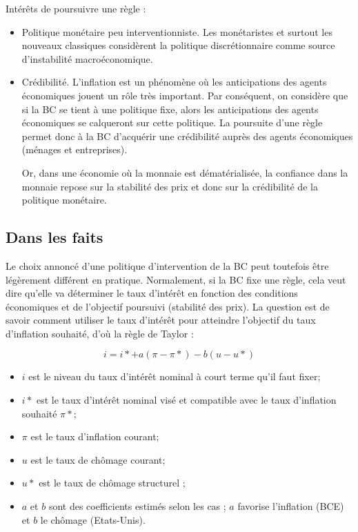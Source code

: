 Intérêts de poursuivre une règle : 

\begin{itemize}
	\item Politique monétaire peu interventionniste. Les monétaristes et surtout les nouveaux classiques considèrent la politique discrétionnaire comme source d'instabilité macroéconomique.
	\item Crédibilité. L'inflation est un phénomène où les anticipations des agents économiques jouent un rôle très important. Par conséquent, on considère que si la BC se tient à une politique fixe, alors les anticipations des agents économiques se calqueront sur cette politique. La poursuite d'une règle permet donc à la BC d'acquérir une crédibilité auprès des agents économiques (ménages et entreprises).

	Or, dans une économie où la monnaie est dématérialisée, la confiance dans la monnaie repose sur la stabilité des prix et donc sur la crédibilité de la politique monétaire.
\end{itemize}

	\subsection{Dans les faits}
	
	Le choix annoncé d'une politique d'intervention de la BC peut toutefois être légèrement différent en pratique. Normalement, si la BC fixe une règle, cela veut dire qu'elle va déterminer le taux d'intérêt en fonction des conditions économiques et de l'objectif poursuivi (stabilité des prix). La question est de savoir comment utiliser le taux d'intérêt pour atteindre 
l'objectif du taux d'inflation souhaité, d'où la règle de Taylor :

	$$i = i* + a(\pi - \pi*) - b(u - u*)$$

	\begin{itemize}
		\item $i$ est le niveau du taux d'intérêt nominal à court terme qu'il faut fixer;
		\item $i*$ est le taux d'intérêt nominal visé et compatible avec le taux d'inflation souhaité $\pi*$;
		\item $\pi$ est le taux d'inflation courant;
		\item $u$ est le taux de chômage courant;
		\item $u*$ est le taux de chômage structurel ;
		\item $a$ et $b$ sont des coefficients estimés selon les cas ; $a$ favorise l'inflation (BCE) et $b$ le chômage (Etats-Unis).
	\end{itemize}
